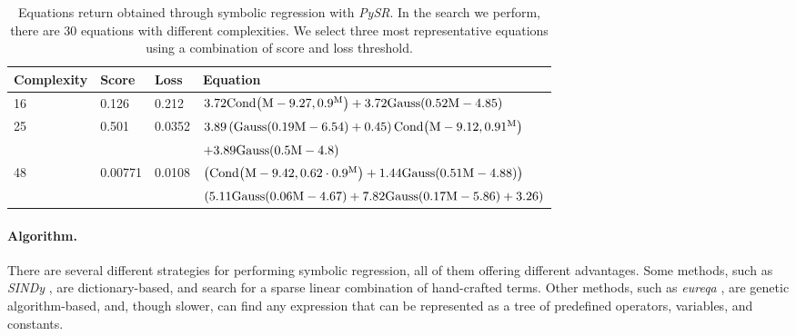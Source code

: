 \documentclass[nohyperref]{article}
\newcommand\pysr{\textit{PySR}\xspace}
\theoremstyle{plain}
\theoremstyle{definition}
\theoremstyle{remark}
\begin{document}
\begin{table*}[hbt!]
    \begin{center}
    \begin{tabular}{ l l l l }
    \hline
    \hline
    Complexity &  Score & Loss & Equation\\
    \hline
    \hline
    16 & 0.126   & 0.212  & $3.72 \rm{Cond}{\left(M - 9.27,0.9^{M} \right)} + 3.72 \rm{Gauss}{\left(0.52 M - 4.85 \right)}$\\
    25 & 0.501   & 0.0352 & $3.89 \left(\rm{Gauss}{\left(0.19 M - 6.54 \right)} + 0.45\right) \rm{Cond}{\left(M - 9.12,0.91^{M} \right)}$\\
    & & & $ + 3.89 \rm{Gauss}{\left(0.5 M - 4.8 \right)}$\\
    48 & 0.00771 & 0.0108 & $\left(\rm{Cond}{\left(M - 9.42,0.62 \cdot 0.9^{M} \right)} + 1.44 \rm{Gauss}{\left(0.51 M - 4.88 \right)}\right)$\\
    & & & $\left(5.11 \rm{Gauss}{\left(0.06 M - 4.67 \right)} + 7.82 \rm{Gauss}{\left(0.17 M - 5.86 \right)} + 3.26\right)$\\
    \hline
    \hline
    \end{tabular}
    \caption{Equations return obtained through symbolic regression with \pysr.
    In the search we perform, there are 30 equations with different complexities.
    We select three most representative equations using a combination of score and loss threshold.}
    \label{tab:equations}
    \end{center}
\end{table*}

\paragraph{Algorithm.}
There are several different strategies for performing symbolic regression, all of them offering different advantages.
Some methods, such as \textit{SINDy} \cite{bruntonDiscoveringGoverningEquations2016}, are dictionary-based, and search for a sparse linear combination of hand-crafted terms.
Other methods, such as \textit{eureqa} \cite{schmidtDistillingFreeFormNatural2009}, are genetic algorithm-based, and, though slower, can find any expression that can be represented as a tree of predefined operators, variables, and constants.
\end{document}

